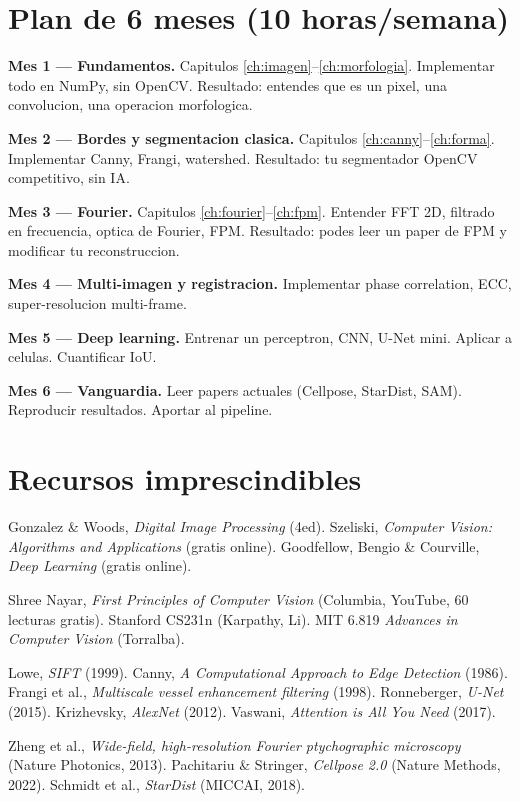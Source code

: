 \documentclass[11pt,a4paper,twoside,openright]{book}
\begin{document}
\section{Plan de 6 meses (10 horas/semana)}

\textbf{Mes 1 --- Fundamentos.} Capitulos \ref{ch:imagen}--\ref{ch:morfologia}. Implementar todo en NumPy, sin OpenCV. Resultado: entendes que es un pixel, una convolucion, una operacion morfologica.

\textbf{Mes 2 --- Bordes y segmentacion clasica.} Capitulos \ref{ch:canny}--\ref{ch:forma}. Implementar Canny, Frangi, watershed. Resultado: tu segmentador OpenCV competitivo, sin IA.

\textbf{Mes 3 --- Fourier.} Capitulos \ref{ch:fourier}--\ref{ch:fpm}. Entender FFT 2D, filtrado en frecuencia, optica de Fourier, FPM. Resultado: podes leer un paper de FPM y modificar tu reconstruccion.

\textbf{Mes 4 --- Multi-imagen y registracion.} Implementar phase correlation, ECC, super-resolucion multi-frame.

\textbf{Mes 5 --- Deep learning.} Entrenar un perceptron, CNN, U-Net mini. Aplicar a celulas. Cuantificar IoU.

\textbf{Mes 6 --- Vanguardia.} Leer papers actuales (Cellpose, StarDist, SAM). Reproducir resultados. Aportar al pipeline.

\section{Recursos imprescindibles}

\begin{description}[leftmargin=2em, style=nextline]
  \item[Libros]
  Gonzalez \& Woods, \emph{Digital Image Processing} (4ed). Szeliski, \emph{Computer Vision: Algorithms and Applications} (gratis online). Goodfellow, Bengio \& Courville, \emph{Deep Learning} (gratis online).

  \item[Cursos en video]
  Shree Nayar, \emph{First Principles of Computer Vision} (Columbia, YouTube, 60 lecturas gratis). Stanford CS231n (Karpathy, Li). MIT 6.819 \emph{Advances in Computer Vision} (Torralba).

  \item[Papers fundacionales]
  Lowe, \emph{SIFT} (1999). Canny, \emph{A Computational Approach to Edge Detection} (1986). Frangi et al., \emph{Multiscale vessel enhancement filtering} (1998). Ronneberger, \emph{U-Net} (2015). Krizhevsky, \emph{AlexNet} (2012). Vaswani, \emph{Attention is All You Need} (2017).

  \item[Para microscopia y FPM]
  Zheng et al., \emph{Wide-field, high-resolution Fourier ptychographic microscopy} (Nature Photonics, 2013). Pachitariu \& Stringer, \emph{Cellpose 2.0} (Nature Methods, 2022). Schmidt et al., \emph{StarDist} (MICCAI, 2018).
\end{description}
\end{document}
